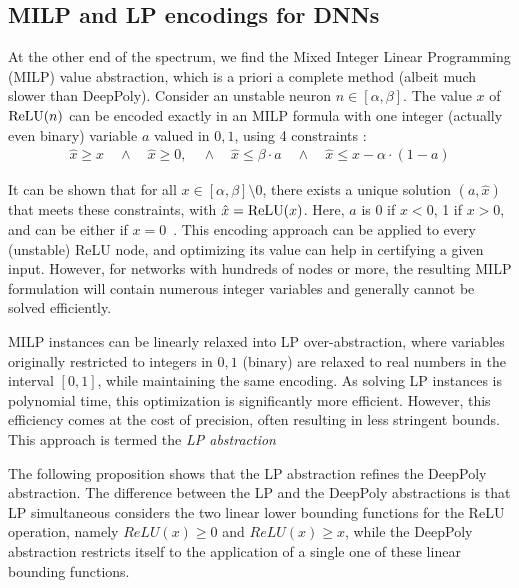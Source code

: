 \iffalse
\subsection{PRIMA and $\beta$-CROWN}
\fi

\subsection{MILP and LP encodings for DNNs}

At the other end of the spectrum, we find the Mixed Integer Linear Programming (MILP) value abstraction, which is a priori a complete method (albeit much slower than DeepPoly). 
Consider an unstable neuron $n \in[\alpha,\beta]$. The value $x$ of $\mathrm{ReLU}(n)$ can be encoded exactly in an MILP formula with one integer (actually even binary) variable $a$ valued in ${0,1}$, using 4 constraints \cite{MILP}:
\vspace{-0.1cm}
\begin{align*}
	\hat{x} \geq x \quad \wedge \quad \hat{x} \geq 0, \quad \wedge \quad \hat{x} \leq \beta \cdot a \quad \wedge \quad \hat{x} \leq x-\alpha \cdot (1-a)
\end{align*}

It can be shown that for all $x \in [\alpha,\beta] \setminus 0$, there exists a unique solution $(a,\hat{x})$ that meets these constraints, with $\hat{x}=\mathrm{ReLU}(x)$. Here, $a$ is 0 if $x < 0$, 1 if $x>0$, and can be either if $x=0$~\cite{MILP}. This encoding approach can be applied to every (unstable) ReLU node, and optimizing its value can help in certifying a given input. However, for networks with hundreds of nodes or more, the resulting MILP formulation will contain numerous integer variables and generally cannot be solved efficiently.

MILP instances can be linearly relaxed into LP over-abstraction, where variables originally restricted to integers in ${0,1}$ (binary) are relaxed to real numbers in the interval $[0,1]$, while maintaining the same encoding. As solving LP instances is polynomial time, this optimization is significantly more efficient. However, this efficiency comes at the cost of precision, often resulting in less stringent bounds. This approach is termed the {\em LP abstraction}

The following proposition shows that the LP abstraction refines the DeepPoly abstraction. 
The difference between the LP and the DeepPoly abstractions is that LP simultaneous considers the two linear lower bounding functions for the ReLU operation, namely $ReLU(x) \geq 0$ and $ReLU(x) \geq x$, while the DeepPoly abstraction restricts itself to the application of a single one of these linear bounding functions.
 

